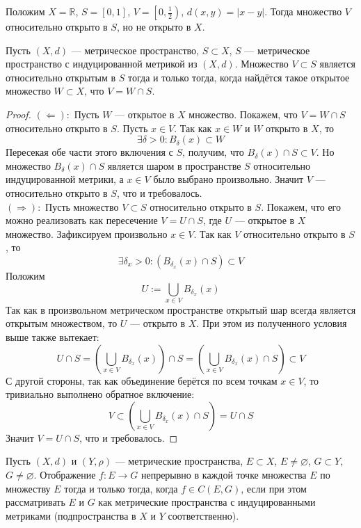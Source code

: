 \documentclass[11pt]{article}
\begin{document}
\begin{example}
    Положим $X = \mathbb{R}$, $S = [0, 1]$, $V = \left[0, \frac{1}{2}\right)$, $d(x, y) = \left\lvert x - y \right\rvert$. Тогда 
    множество $V$ относительно открыто в $S$, но не открыто в $X$.
\end{example}

\begin{lemma}
    Пусть $(X, d)$ --- метрическое пространство, $S \subset X$, $S$ --- метрическое пространство 
    с индуцированной метрикой из $(X, d)$. Множество $V \subset S$ является относительно открытым в $S$ тогда и 
    только тогда, когда найдётся такое открытое множество $W \subset X$, что $V = W \cap S$.
\end{lemma}

\begin{proof}
    $(\Longleftarrow):$ Пусть $W$ --- открытое в $X$ множество. Покажем, что $V = W \cap S$ относительно 
    открыто в $S$. Пусть $x \in V$. Так как $x \in W$ и $W$ открыто в $X$, то 
    \[\exists \delta > 0: B_{\delta}(x) \subset W\]
    Пересекая обе части этого включения с $S$, получим, что $B_{\delta}(x) \cap S \subset V$. Но множество 
    $B_{\delta}(x) \cap S$ является шаром в пространстве $S$ относительно индуцированной метрики, а $x \in V$ было 
    выбрано произвольно. Значит $V$ --- относительно открыто в $S$, что и требовалось.
    \\
    $(\Longrightarrow):$ Пусть множество $V \subset S$ относительно открыто в $S$. Покажем, что 
    его можно реализовать как пересечение $V = U \cap S$, где $U$ --- открытое в $X$ множество.
    Зафиксируем произвольно $x \in V$. Так как $V$ относительно открыто в $S$, то 
    \[\exists \delta_x > 0: \left(B_{\delta_x}(x) \cap S\right) \subset V\]
    Положим
    \[U := \bigcup_{x \in V} B_{\delta_x}(x)\]
    Так как в произвольном метрическом пространстве открытый шар всегда является открытым множеством, то 
    $U$ --- открыто в $X$. При этом из полученного условия выше также вытекает:
    \[U \cap S = \left(\bigcup_{x \in V} B_{\delta_x}(x)\right) \cap S = \left(\bigcup_{x \in V} B_{\delta_x}(x) \cap S \right) \subset V\]
    С другой стороны, так как объединение берётся по всем точкам $x \in V$, то тривиально выполнено 
    обратное включение:
    \[V \subset \left(\bigcup_{x \in V} B_{\delta_x}(x) \cap S \right) = U \cap S\]
    Значит $V = U \cap S$, что и требовалось.
\end{proof}

\begin{lemma}
    Пусть $(X, d)$ и $(Y, \rho)$ --- метрические пространства, $E \subset X$, $E \neq \varnothing$, 
    $G \subset Y$, $G \neq \varnothing$. Отображение $f \colon E \to G$ непрерывно в каждой точке 
    множества $E$ по множеству $E$ тогда и только тогда, когда $f \in C(E, G)$, если при этом 
    рассматривать $E$ и $G$ как метрические пространства с индуцированными метриками (подпространства в $X$ и $Y$ соответственно).
\end{lemma}
\end{document}
